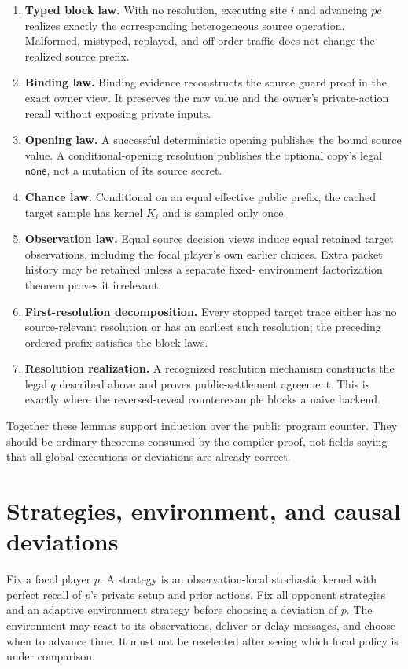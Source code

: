 \documentclass[11pt]{article}
\newcommand{\None}{\mathsf{none}}
\begin{document}
\begin{enumerate}
\item \textbf{Typed block law.}  With no resolution, executing site $i$ and
      advancing $pc$ realizes exactly the corresponding heterogeneous source
      operation.  Malformed, mistyped, replayed, and off-order traffic does not
      change the realized source prefix.
\item \textbf{Binding law.}  Binding evidence reconstructs the source guard
      proof in the exact owner view.  It preserves the raw value and the
      owner's private-action recall without exposing private inputs.
\item \textbf{Opening law.}  A successful deterministic opening publishes the
      bound source value.  A conditional-opening resolution publishes the
      optional copy's legal $\None$, not a mutation of its source secret.
\item \textbf{Chance law.}  Conditional on an equal effective public prefix,
      the cached target sample has kernel $K_i$ and is sampled only once.
\item \textbf{Observation law.}  Equal source decision views induce equal
      retained target observations, including the focal player's own earlier
      choices.  Extra packet history may be retained unless a separate fixed-
      environment factorization theorem proves it irrelevant.
\item \textbf{First-resolution decomposition.}  Every stopped target trace
      either has no source-relevant resolution or has an earliest such
      resolution; the preceding ordered prefix satisfies the block laws.
\item \textbf{Resolution realization.}  A recognized resolution mechanism
      constructs the legal $q$ described above and proves public-settlement
      agreement.  This is exactly where the reversed-reveal counterexample
      blocks a naive backend.
\end{enumerate}

Together these lemmas support induction over the public program counter.  They
should be ordinary theorems consumed by the compiler proof, not fields saying
that all global executions or deviations are already correct.

\section{Strategies, environment, and causal deviations}

Fix a focal player $p$.  A strategy is an observation-local stochastic kernel
with perfect recall of $p$'s private setup and prior actions.  Fix all opponent
strategies and an adaptive environment strategy before choosing a deviation of
$p$.  The environment may react to its observations, deliver or delay
messages, and choose when to advance time.  It must not be reselected after
seeing which focal policy is under comparison.
\end{document}
